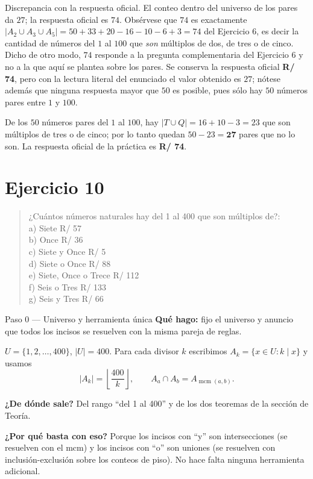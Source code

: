 \documentclass[11pt]{article}
\begin{document}
\begin{nota}
Discrepancia con la respuesta oficial. El conteo dentro del universo de los pares da $27$; la respuesta oficial es $74$. Obsérvese que $74$ es exactamente $|A_2\cup A_3\cup A_5| = 50+33+20-16-10-6+3 = 74$ del Ejercicio 6, es decir la cantidad de números del $1$ al $100$ que \emph{son} múltiplos de dos, de tres o de cinco. Dicho de otro modo, $74$ responde a la pregunta complementaria del Ejercicio 6 y no a la que aquí se plantea sobre los pares. Se conserva la respuesta oficial \textbf{R/ 74}, pero con la lectura literal del enunciado el valor obtenido es $27$; nótese además que ninguna respuesta mayor que $50$ es posible, pues sólo hay $50$ números pares entre $1$ y $100$.
\end{nota}

\begin{resp}
De los $50$ números pares del $1$ al $100$, hay $|T\cup Q| = 16+10-3 = 23$ que son múltiplos de tres o de cinco; por lo tanto quedan $50-23=\mathbf{27}$ pares que no lo son. La respuesta oficial de la práctica es \textbf{R/ 74}.
\end{resp}

\section*{Ejercicio 10}

\begin{quote}
¿Cuántos números naturales hay del 1 al 400 que son múltiplos de?:\\
a) Siete \hfill R/ 57\\
b) Once \hfill R/ 36\\
c) Siete y Once \hfill R/ 5\\
d) Siete o Once \hfill R/ 88\\
e) Siete, Once o Trece \hfill R/ 112\\
f) Seis o Tres \hfill R/ 133\\
g) Seis y Tres \hfill R/ 66
\end{quote}

\begin{paso}{Paso 0 --- Universo y herramienta única}
\textbf{Qué hago:} fijo el universo y anuncio que todos los incisos se resuelven con la misma pareja de reglas.

$U=\{1,2,\dots,400\}$, $|U|=400$. Para cada divisor $k$ escribimos $A_k=\{x\in U: k\mid x\}$ y usamos
\[
|A_k| = \left\lfloor \frac{400}{k}\right\rfloor,\qquad A_a\cap A_b = A_{\operatorname{mcm}(a,b)} .
\]

\textbf{¿De dónde sale?} Del rango ``del 1 al 400'' y de los dos teoremas de la sección de Teoría.

\textbf{¿Por qué basta con eso?} Porque los incisos con ``y'' son intersecciones (se resuelven con el mcm) y los incisos con ``o'' son uniones (se resuelven con inclusión-exclusión sobre los conteos de piso). No hace falta ninguna herramienta adicional.
\end{paso}
\end{document}
